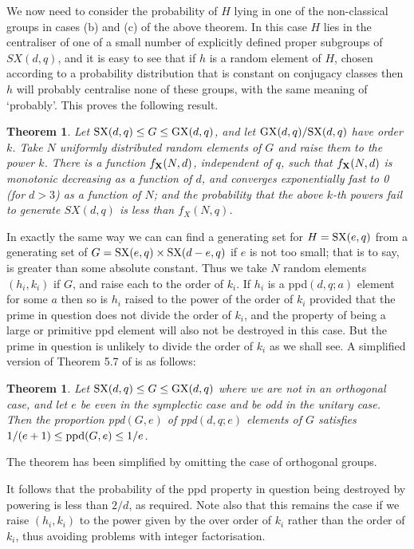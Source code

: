 \documentclass[12pt]{article}
\newtheorem{theorem}[definition]{Theorem}
\def\X{{\bf X}}
\def\SX{{\rm SX}}
\def\GX{{\rm GX}}
\begin{document}
We now need to consider the probability of $H$ lying in one of the
non-classical groups in cases (b) and (c) of the above theorem.
In this case $H$ lies in the centraliser of one of a small number of
explicitly defined proper subgroups of $SX(d,q)$, and it is easy to
see that if $h$ is a random element of $H$, chosen according to a
probability distribution that is constant on conjugacy classes then
$h$ will probably centralise none of these groups, with the same meaning
of `probably'.  This proves the following result.

\begin{theorem}
 Let $\SX(d,q)\le G\le\GX(d,q)$, and let $\GX(d,q)/\SX(d,q)$
have order $k$.  Take $N$ uniformly distributed random elements of
$G$ and raise them to the power $k$.  There is a function $f_\X(N,d)$,
independent of $q$, such that $f_\X(N,d)$ is monotonic decreasing as a
function of $d$, and converges exponentially fast to 0 (for $d>3$) as a
function of $N$; and the probability that the above $k$-th powers
fail to generate $SX(d,q)$ is less than $f_X(N,q)$.
\end{theorem}

In exactly the same way we can can find a generating set for
$H=\SX(e,q)$ from a generating set of $G=\SX(e,q)\times\SX(d-e,q)$ if $e$
is not too small; that is to say, is greater than some absolute
constant.  Thus we take $N$ random elements $(h_i,k_i)$ if $G$, and raise
each to the order of $k_i$.  If $h_i$ is a ppd$(d,q;a)$ element for
some $a$ then so is $h_i$ raised to the power of the order of $k_i$
provided that the prime in question does not divide the order of $k_i$,
and the property of being a large or primitive ppd element will also
not be destroyed in this case.  But the prime in question is unlikely
to divide the order of $k_i$ as we shall see.  A simplified version
of Theorem 5.7 of \cite{NP} is as follows:

\begin{theorem}
 Let $\SX(d,q)\le G\le\GX(d,q)$ where we are not in an
orthogonal case, and let $e$ be even in the symplectic case and be odd
in the unitary case.  Then the proportion ppd$(G,e)$ of ppd$(d,q;e)$ elements
of $G$ satisfies $1/(e+1)\le {\rm ppd}(G,e)\le 1/e$.
\end{theorem}

The theorem has been simplified by omitting the case of orthogonal groups.

It follows that the probability of the ppd property in question being destroyed
by powering is less than $2/d$, as required.  Note also that this remains the
case if we raise $(h_i,k_i)$ to the power given by the over order of $k_i$
rather than the order of $k_i$, thus avoiding problems with integer factorisation.
\end{document}
